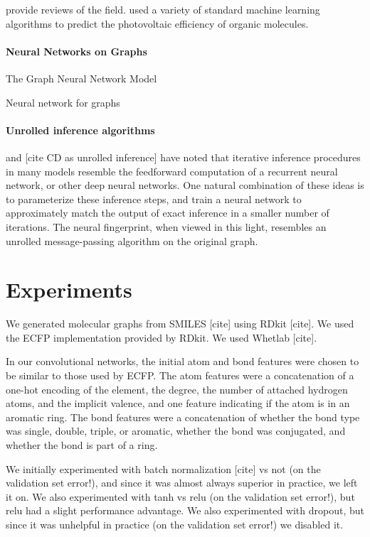 \documentclass{article}
\begin{document}
\cite{Eckert2007225, bergeron2011modeling} provide reviews of the field.
\cite{tingley2014towards} used a variety of standard machine learning algorithms to predict the photovoltaic efficiency of organic molecules.

\paragraph{Neural Networks on Graphs}

\cite{graphnn2009} The Graph Neural Network Model

\cite{micheli2009neural} Neural network for graphs

\paragraph{Unrolled inference algorithms}
\citet{hershey2014deep} and [cite CD as unrolled inference] have noted that iterative inference procedures in many models resemble the feedforward computation of a recurrent neural network, or other deep neural networks.
One natural combination of these ideas is to parameterize these inference steps, and train a neural network to approximately match the output of exact inference in a smaller number of iterations.
The neural fingerprint, when viewed in this light, resembles an unrolled message-passing algorithm on the original graph.


\section{Experiments}

We generated molecular graphs from SMILES [cite] using RDkit [cite].
We used the ECFP implementation provided by RDkit.
We used Whetlab [cite].

In our convolutional networks, the initial atom and bond features were chosen to be similar to those used by ECFP.
The atom features were a concatenation of a one-hot encoding of the element, the degree, the number of attached hydrogen atoms, and the implicit valence, and one feature indicating if the atom is in an aromatic ring. 
The bond features were a concatenation of whether the bond type was single, double, triple, or aromatic, whether the bond was conjugated, and whether the bond is part of a ring.

We initially experimented with batch normalization [cite] vs not (on the validation set error!), and since it was almost always superior in practice, we left it on.
We also experimented with tanh vs relu (on the validation set error!), but relu had a slight performance advantage.
We also experimented with dropout, but since it was unhelpful in practice (on the validation set error!) we disabled it. 
\end{document}
